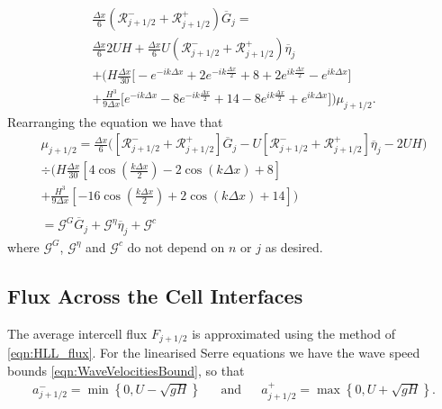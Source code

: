 \begin{multline*}
\frac{\Delta x}{6} \left(\mathcal{R}^-_{j +1/2} + \mathcal{R}^+_{j +1/2} \right) \overline{G}_j =  \\
\frac{\Delta x}{6} 2UH   + \frac{\Delta x}{6} U \left(\mathcal{R}^-_{j +1/2} + \mathcal{R}^+_{j +1/2} \right) \overline{\eta}_j\\ +   \Bigg(H\frac{\Delta x}{30} \Bigg[ -e^{-ik\Delta x } +  2 e^{-ik\frac{\Delta x}{2}}  + 8 + 2 e^{ik\frac{\Delta x}{2}} - e^{ik{\Delta x}}  \Bigg]   \\ + \frac{H^3 }{9\Delta x} \Bigg[  e^{-ik{\Delta x}} -8e^{-ik\frac{\Delta x}{2}} + 14  - 8 e^{ik\frac{\Delta x}{2}} + e^{ik{\Delta x}}  \Bigg]    \Bigg) \mu_{j+1/2}. 
\end{multline*}
Rearranging the equation we have that
\begin{align}
\label{eqn:2ndFEMutoG}
\mu_{j+1/2} =  
\frac{\Delta x}{6} \Bigg(\left[\mathcal{R}^-_{j +1/2} + \mathcal{R}^+_{j +1/2}\right]  \overline{G}_{j} \nonumber - U\left[\mathcal{R}^-_{j +1/2} + \mathcal{R}^+_{j +1/2} \right]  \overline{\eta}_{j}   - 2UH  \Bigg) \nonumber\\
\div  \Bigg(H\frac{\Delta x}{30} \left[ 4\cos\left(\frac{k \Delta x}{2}\right) - 2\cos\left({k \Delta x}\right) + 8\right]  \nonumber \\ + \frac{H^3 }{9\Delta x}\left[-16\cos\left(\frac{k\Delta x}{2}\right) + 2 \cos\left(k \Delta x\right) + 14\right]    \Bigg)
\nonumber \\ \nonumber\\ =  \mathcal{G}^G \overline{G}_{j} + \mathcal{G}^{\eta} \overline{\eta}_{j} + \mathcal{G}^c 
\end{align}
where $\mathcal{G}^G$, $\mathcal{G}^\eta$ and $\mathcal{G}^c$ do not depend on $n$ or $j$ as desired.

 

\subsection{Flux Across the Cell Interfaces}
The average intercell flux $F_{j+1/2}$ is approximated using the method of \citet{Kurganov-etal-2001-707} \eqref{eqn:HLL_flux}. For the linearised Serre equations we have the wave speed bounds \eqref{eqn:WaveVelocitiesBound}, so that
\begin{align}
a^-_{j+ 1/2} = \min \left\lbrace 0,  U - \sqrt{g H} \right \rbrace& &\text{and}& &a^+_{j+ 1/2} =  \max \left\lbrace 0, U + \sqrt{g H} \right \rbrace .
\label{eqn:wavespeedboundslinSerre}
\end{align}

